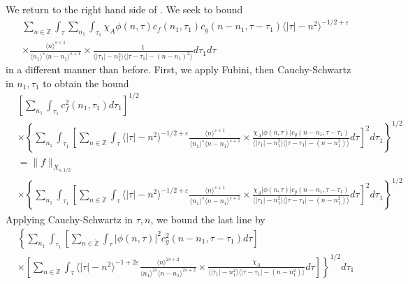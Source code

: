 \documentclass[12pt,reqno]{amsart}
\numberwithin{equation}{section}  %
\renewcommand{\cref}{\Cref}
\newcommand{\zz}{\mathbb{Z}}
\newcommand{\zzdot}{\dot{\zz}}
\newcommand{\ee}{\varepsilon}
\begin{document}
%
%
We return to the right hand side of \cref{pre-fubini-int-form}.
We seek to bound
\begin{equation*}
\begin{split}
  & \sum_{n \in \zzdot} \int_{\tau}  \sum_{n_{1}}
  \int_{\tau_{1}} \chi_{A} \phi(n, \tau)
    c_f(n_1, \tau_1)
    c_g(n - n_1, \tau - \tau_1 ) \langle | \tau | - n^{2} \rangle ^{-1/2+\ee}
		\\
    & \times \frac{\langle n \rangle ^{s+1}}{\langle n_{1} \rangle ^{s} \langle
    n-n_{1} \rangle ^{s+1}} \times \frac{1}{\langle |\tau_{1}| - n_{1}^{2} \rangle
    \langle |\tau - \tau_{1}|-(n - n_{1})^{2} \rangle } d \tau_1 d \tau 
   \end{split}
\end{equation*}
in a different manner than before. First, we apply 
Fubini, then Cauchy-Schwartz in $n_{1}, \tau_{1}$ to obtain the bound
%
%
\begin{equation*}
\begin{split}
  & \left[ \sum_{n_{1}} \int_{\tau_{1}} c_{f}^{2}(n_{1}, \tau_{1}) d \tau_{1}
  \right]^{1/2}
  \\
  & \times \left \{\sum_{n_{1}} \int_{\tau_{1}}   
 \left[
 \sum_{n \in \zzdot} \int_{\tau} \langle | \tau | - n^{2} \rangle ^{-1/2+\ee}
   \frac{\langle n \rangle ^{s+1}}{\langle n_{1} \rangle ^{s} \langle
    n-n_{1} \rangle ^{s+1}} 
   \times \frac{\chi_{A} |\phi(n, \tau)| c_{g}(n -
   n_{1}, \tau - \tau_{1})
}{\langle | \tau_{1} | - n_{1}^{2} \rangle \langle | \tau -
  \tau_{1} | - (n - n_{1}^{2}) \rangle} d \tau 
  \right]^{2} d \tau_{1} \right \}^{1/2}
  \\
  & = \| f \|_{X_{s,1/2}}
  \\
  & \times \left \{\sum_{n_{1}} \int_{\tau_{1}}   
 \left[
 \sum_{n \in \zzdot} \int_{\tau} \langle | \tau | - n^{2} \rangle ^{-1/2+\ee}
   \frac{\langle n \rangle ^{s+1}}{\langle n_{1} \rangle ^{s} \langle
    n-n_{1} \rangle ^{s+1}} 
   \times \frac{\chi_{A}|\phi(n, \tau)| c_{g}(n -
   n_{1}, \tau - \tau_{1}) 
}{\langle | \tau_{1} | - n_{1}^{2} \rangle \langle | \tau -
  \tau_{1} | - (n - n_{1}^{2}) \rangle} d \tau 
  \right]^{2} d \tau_{1}  \right \}^{1/2}
\end{split}
\end{equation*}
%
Applying Cauchy-Schwartz in $\tau, n$, we bound the last line by 
%
%
\begin{equation*}
\begin{split}
  & \left \{\sum_{n_{1}} \int_{\tau_{1}}   
  \left [ \sum_{n \in \zzdot} \int_{\tau}
  | \phi(n, \tau)|^{2} c_{g}^{2}(n - n_{1}, \tau - \tau_{1}) d \tau  
    \right ] \right . 
   \\
   & \left. \times \left [ \sum_{n \in \zzdot} \int_{\tau} 
\langle | \tau | - n^{2} \rangle ^{-1 + 2\ee}
     \frac{\langle n \rangle
   ^{2s+2}}{\langle n_{1} \rangle ^{2s} \langle n - n_{1}\rangle ^{2s+2}}
   \times \frac{\chi_{A}}{\langle | \tau_{1} |
   - n_{1}^{2} \rangle  \langle | \tau - \tau_{1} | - (n - n_{1}^{2})
   \rangle} d \tau  \right ] \right \}^{1/2}d \tau_{1} 
\end{split}
\end{equation*}
\end{document}

